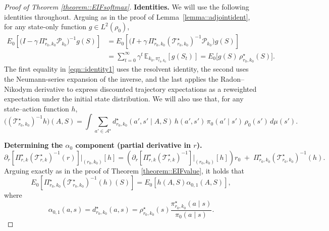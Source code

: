 \documentclass[11pt]{article}
\theoremstyle{plain}
\begin{document}
\begin{proof}[Proof of Theorem \ref{theorem::EIFsoftmax}]
 
 
 

\noindent \textbf{Identities.} We will use the following identities throughout. Arguing as in the proof of Lemma~\ref{lemma::adjointident}, for any state-only function $g\in L^2(\rho_0)$,
\begin{equation}
\label{eqn::identity1}
\begin{aligned}
E_0\!\left[\big(I-\gamma\,\Pi_{r_0,k_0}^\star \mathcal{P}_{k_0}\big)^{-1} g(S)\right]
&= E_0\!\left[\Big(I + \gamma\,\Pi_{r_0,k_0}^\star (\mathcal{T}_{r_0,k_0}^\star)^{-1}\mathcal{P}_{k_0}\Big) g(S)\right] \\
&= \sum_{t=0}^\infty \gamma^t\,\mathbb{E}_{k_0,\pi_{r_0,k_0}^\star}[g(S_t)]
= E_0\!\big[g(S)\,\rho_{r_0,k_0}^\star(S)\big].
\end{aligned}
\end{equation}
The first equality in \eqref{eqn::identity1} uses the resolvent identity,
the second uses the Neumann-series expansion of the inverse,
and the last applies the Radon--Nikodym derivative to express discounted
trajectory expectations as a reweighted expectation under the initial state distribution. 
We will also use that, for any state–action function \(h\),
\begin{equation}
    \label{eqn::identity2}
\big((\mathcal{T}_{r_0,k_0}^\star)^{-1} h\big)(A,S)
= \int \sum_{a' \in \mathcal{A}^\star} d_{r_0,k_0}^{\star}(a',s'\mid A,S)\,h(a',s')\,
\pi_0(a'\mid s')\,\rho_0(s')\,d\mu(s').
\end{equation}

\noindent \textbf{Determining the $\alpha_0$ component (partial derivative in $r$).}
\[
\partial_r\!\left[\Pi_{r,k}^\star (\mathcal T_{r,k}^\star)^{-1}(r)\right]\Big|_{(r_0,k_0)}[h]
= \left(\partial_r\!\left[\Pi_{r,k}^\star (\mathcal T_{r,k}^\star)^{-1}\right]\Big|_{(r_0,k_0)}[h]\right)\!r_0
\;+\; \Pi_{r_0,k_0}^\star (\mathcal T_{r_0,k_0}^\star)^{-1}(h).
\]
Arguing exactly as in the proof of Theorem \ref{theorem::EIFvalue}, it holds that
\begin{equation}
    E_0[\Pi_{r_0,k_0}^\star (\mathcal T_{r_0,k_0}^\star)^{-1}(h)(S)] = E_0[h(A,S) \alpha_{0,1}(A,S)],\label{eqnproof::alpha01}
\end{equation}
where
$$\alpha_{0,1}(a,s) = d_{r_0,k_0}^{\star}(a,s) = \rho_{r_0,k_0}^{\star}(s) \frac{\pi_{r_0, k_0}^\star(a \mid s)}{\pi_0(a\mid s)}.$$



\end{proof}
\end{document}
